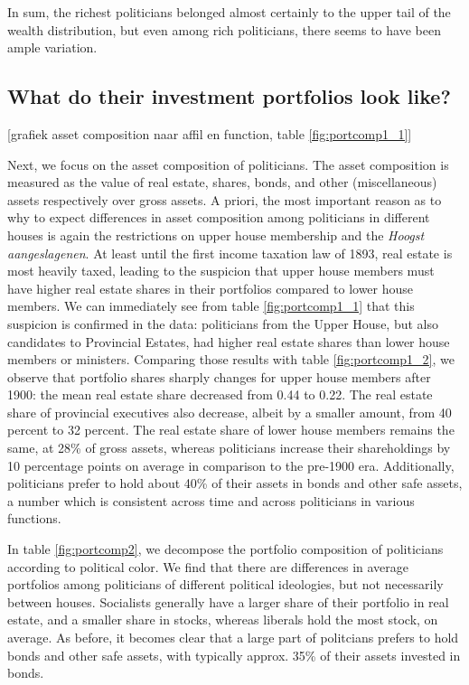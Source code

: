     In sum, the richest politicians belonged almost certainly to the upper tail of the wealth distribution, but even among rich politicians, there seems to have been ample variation. 
    

\subsection{What do their investment portfolios look like?}

\begin{center}    
    [grafiek asset composition naar affil en function, table \ref{fig:portcomp1_1}]
    
\end{center}
    
    Next, we focus on the asset composition of politicians. The asset composition is measured as the value of real estate, shares, bonds, and other (miscellaneous) assets respectively over gross assets. A priori, the most important reason as to why to expect differences in asset composition among politicians in different houses is again the restrictions on upper house membership and the \textit{Hoogst aangeslagenen}. At least until the first income taxation law of 1893, real estate is most heavily taxed, leading to the suspicion that upper house members must have higher real estate shares in their portfolios compared to lower house members. We can immediately see from table \ref{fig:portcomp1_1} that this suspicion is confirmed in the data: politicians from the Upper House, but also candidates to Provincial Estates, had higher real estate shares than lower house members or ministers. Comparing those results with table \ref{fig:portcomp1_2}, we observe that portfolio shares sharply changes for upper house members after 1900: the mean real estate share decreased from 0.44 to 0.22. The real estate share of provincial executives also decrease, albeit by a smaller amount, from 40 percent to 32 percent. The real estate share of lower house members remains the same, at 28\% of gross assets, whereas politicians increase their shareholdings by 10 percentage points on average in comparison to the pre-1900 era. Additionally, politicians prefer to hold about 40\% of their assets in bonds and other safe assets, a number which is consistent across time and across politicians in various functions. 
    
    In table \ref{fig:portcomp2}, we decompose the portfolio composition of politicians according to political color. We find that there are differences in average portfolios among politicians of different political ideologies, but not necessarily between houses. Socialists generally have a larger share of their portfolio in real estate, and a smaller share in stocks, whereas liberals hold the most stock, on average. As before, it becomes clear that a large part of politcians prefers to hold bonds and other safe assets, with typically approx. 35\% of their assets invested in bonds. 

